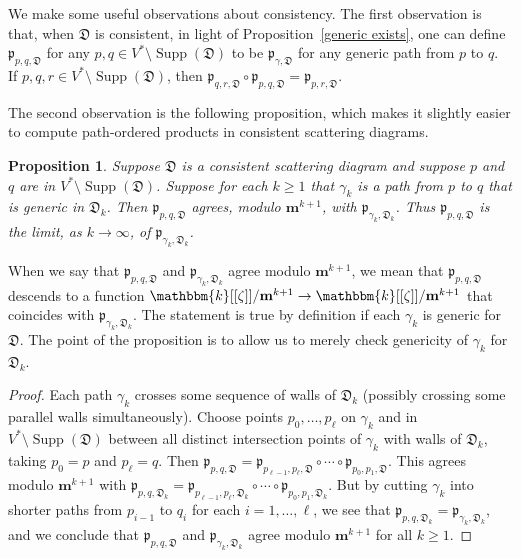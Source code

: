 \documentclass{amsart}
\newtheorem{prop}[proposition]{Proposition}
\theoremstyle{definition}
\theoremstyle{remark}
\numberwithin{equation}{section}
\newcommand{\D}{{\mathfrak D}}
\newcommand{\p}{{\mathfrak p}}
\newcommand{\0}{{\mathbf{0}}}
\newcommand{\m}{\mathbf{m}}
\renewcommand{\k}{\mathbbm{k}}
\newcommand{\Supp}{\operatorname{Supp}}
\begin{document}
We make some useful observations about consistency.
The first observation is that, when $\D$ is consistent, in light of Proposition~\ref{generic exists}, one can define $\p_{p,q,\D}$ for any $p,q\in V^*\setminus\Supp(\D)$ to be $\p_{\gamma,\D}$ for any generic path from $p$ to $q$.
If $p,q,r\in V^*\setminus\Supp(\D)$, then $\p_{q,r,\D}\circ\p_{p,q,\D}=\p_{p,r,\D}$.

The second observation is the following proposition, which makes it slightly easier to compute path-ordered products in consistent scattering diagrams.
\begin{prop}\label{easier limit}
Suppose $\D$ is a consistent scattering diagram and suppose $p$ and $q$ are in $V^*\setminus\Supp(\D)$.
Suppose for each $k\ge 1$ that $\gamma_k$ is a path from $p$ to $q$ that is generic in $\D_k$.
Then $\p_{p,q,\D}$ agrees, modulo $\m^{k+1}$, with $\p_{\gamma_k,\D_k}$.
Thus $\p_{p,q,\D}$ is the limit, as $k\to\infty$, of $\p_{\gamma_k,\D_k}$.
\end{prop}
When we say that $\p_{p,q,\D}$ and $\p_{\gamma_k,\D_k}$ agree modulo $\m^{k+1}$, we mean that $\p_{p,q,\D}$ descends to a function $\k[[\zeta]]/{\m^{k+1}}\to\k[[\zeta]]/{\m^{k+1}}$ that coincides with $\p_{\gamma_k,\D_k}$.
The statement is true by definition if each $\gamma_k$ is generic for $\D$.
The point of the proposition is to allow us to merely check genericity of $\gamma_k$ for $\D_k$.
\begin{proof}
Each path $\gamma_k$ crosses some sequence of walls of $\D_k$ (possibly crossing some parallel walls simultaneously).
Choose points $p_0,\ldots,p_\ell$ on $\gamma_k$ and in $V^*\setminus\Supp(\D)$ between all distinct intersection points of $\gamma_k$ with walls of $\D_k$, taking $p_0=p$ and $p_\ell=q$.
Then $\p_{p,q,\D}=\p_{p_{\ell-1},p_\ell,\D}\circ\cdots\circ\p_{p_0,p_1,\D}$.
This agrees modulo $\m^{k+1}$ with $\p_{p,q,\D_k}=\p_{p_{\ell-1},p_\ell,\D_k}\circ\cdots\circ\p_{p_0,p_1,\D_k}$.
But by cutting $\gamma_k$ into shorter paths from $p_{i-1}$ to $q_i$ for each $i=1,\ldots,\ell$, we see that $\p_{p,q,\D_k}=\p_{\gamma_k,\D_k}$, and we conclude that $\p_{p,q,\D}$ and $\p_{\gamma_k,\D_k}$ agree modulo $\m^{k+1}$ for all $k\ge1$.
\end{proof}
\end{document}
